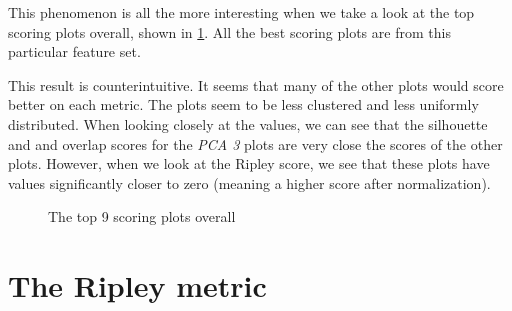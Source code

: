 \documentclass[a4paper, 12pt, twoside]{report}
\begin{document}
This phenomenon is all the more interesting when we take a look at the top scoring plots overall, shown in \ref{fig:top_overall}. All the best scoring plots are from this particular feature set.

This result is counterintuitive. It seems that many of the other plots would score better on each metric. The plots seem to be less clustered and less uniformly distributed. When looking closely at the values, we can see that the silhouette and and overlap scores for the \textit{PCA 3} plots are very close the scores of the other plots. However, when we look at the Ripley score, we see that these plots have values significantly closer to zero (meaning a higher score after normalization).

\begin{figure}[h!tbp]
\centering
{}
\caption{The top 9 scoring plots overall}
\label{fig:top_overall}
\end{figure}

\section{The Ripley metric}
\end{document}
